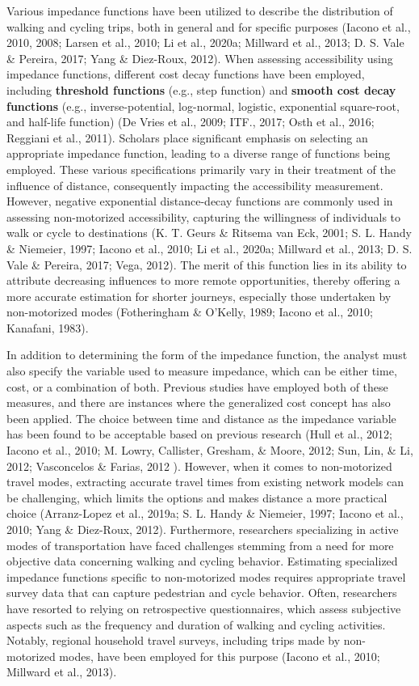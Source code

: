 \documentclass[12pt,twoside]{reedthesis}
\begin{document}
Various impedance functions have been utilized to describe the distribution of walking and cycling trips, both in general and for specific purposes (Iacono et al., 2010, 2008; Larsen et al., 2010; Li et al., 2020a; Millward et al., 2013; D. S. Vale \& Pereira, 2017; Yang \& Diez-Roux, 2012). When assessing accessibility using impedance functions, different cost decay functions have been employed, including \textbf{threshold functions} (e.g., step function) and \textbf{smooth cost decay functions} (e.g., inverse-potential, log-normal, logistic, exponential square-root, and half-life function) (De Vries et al., 2009; ITF., 2017; Osth et al., 2016; Reggiani et al., 2011). Scholars place significant emphasis on selecting an appropriate impedance function, leading to a diverse range of functions being employed. These various specifications primarily vary in their treatment of the influence of distance, consequently impacting the accessibility measurement. However, negative exponential distance-decay functions are commonly used in assessing non-motorized accessibility, capturing the willingness of individuals to walk or cycle to destinations (K. T. Geurs \& Ritsema van Eck, 2001; S. L. Handy \& Niemeier, 1997; Iacono et al., 2010; Li et al., 2020a; Millward et al., 2013; D. S. Vale \& Pereira, 2017; Vega, 2012). The merit of this function lies in its ability to attribute decreasing influences to more remote opportunities, thereby offering a more accurate estimation for shorter journeys, especially those undertaken by non-motorized modes (Fotheringham \& O'Kelly, 1989; Iacono et al., 2010; Kanafani, 1983).

In addition to determining the form of the impedance function, the analyst must also specify the variable used to measure impedance, which can be either time, cost, or a combination of both. Previous studies have employed both of these measures, and there are instances where the generalized cost concept has also been applied. The choice between time and distance as the impedance variable has been found to be acceptable based on previous research (Hull et al., 2012; Iacono et al., 2010; M. Lowry, Callister, Gresham, \& Moore, 2012; Sun, Lin, \& Li, 2012; Vasconcelos \& Farias, 2012 ). However, when it comes to non-motorized travel modes, extracting accurate travel times from existing network models can be challenging, which limits the options and makes distance a more practical choice (Arranz-Lopez et al., 2019a; S. L. Handy \& Niemeier, 1997; Iacono et al., 2010; Yang \& Diez-Roux, 2012). Furthermore, researchers specializing in active modes of transportation have faced challenges stemming from a need for more objective data concerning walking and cycling behavior. Estimating specialized impedance functions specific to non-motorized modes requires appropriate travel survey data that can capture pedestrian and cycle behavior. Often, researchers have resorted to relying on retrospective questionnaires, which assess subjective aspects such as the frequency and duration of walking and cycling activities. Notably, regional household travel surveys, including trips made by non-motorized modes, have been employed for this purpose (Iacono et al., 2010; Millward et al., 2013).
\end{document}

